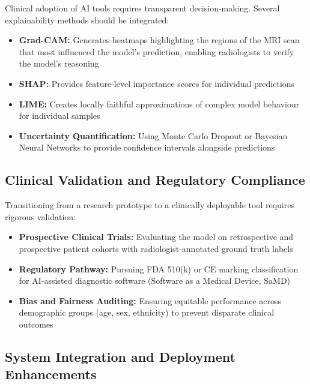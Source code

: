 \documentclass[12pt,a4paper]{article}
\begin{document}
Clinical adoption of AI tools requires transparent decision-making. Several explainability methods should be integrated:

\begin{itemize}
    \item \textbf{Grad-CAM:} Generates heatmaps highlighting the regions of the MRI scan that most influenced the model's prediction, enabling radiologists to verify the model's reasoning
    \item \textbf{SHAP:} Provides feature-level importance scores for individual predictions
    \item \textbf{LIME:} Creates locally faithful approximations of complex model behaviour for individual samples
    \item \textbf{Uncertainty Quantification:} Using Monte Carlo Dropout or Bayesian Neural Networks to provide confidence intervals alongside predictions
\end{itemize}

\subsection{Clinical Validation and Regulatory Compliance}

Transitioning from a research prototype to a clinically deployable tool requires rigorous validation:

\begin{itemize}
    \item \textbf{Prospective Clinical Trials:} Evaluating the model on retrospective and prospective patient cohorts with radiologist-annotated ground truth labels
    \item \textbf{Regulatory Pathway:} Pursuing FDA 510(k) or CE marking classification for AI-assisted diagnostic software (Software as a Medical Device, SaMD)
    \item \textbf{Bias and Fairness Auditing:} Ensuring equitable performance across demographic groups (age, sex, ethnicity) to prevent disparate clinical outcomes
\end{itemize}

\subsection{System Integration and Deployment Enhancements}
\end{document}
